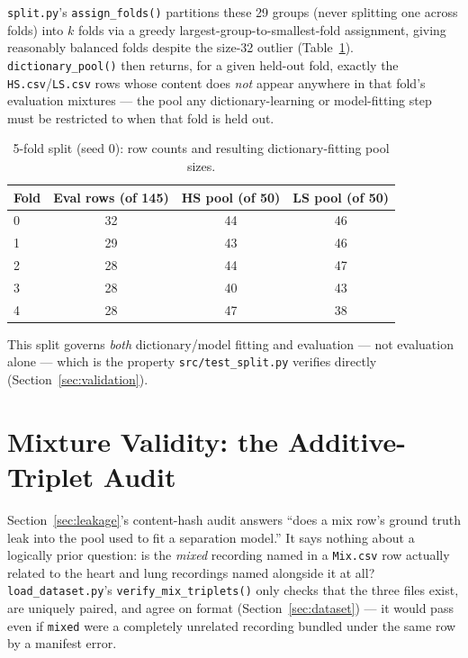 \documentclass[11pt]{article}
\begin{document}
\texttt{split.py}'s \texttt{assign\_folds()} partitions these 29 groups
(never splitting one across folds) into $k$ folds via a greedy
largest-group-to-smallest-fold assignment, giving reasonably balanced folds
despite the size-32 outlier (Table~\ref{tab:foldsizes}).
\texttt{dictionary\_pool()} then returns, for a given held-out fold, exactly
the \texttt{HS.csv}/\texttt{LS.csv} rows whose content does \emph{not}
appear anywhere in that fold's evaluation mixtures --- the pool any
dictionary-learning or model-fitting step must be restricted to when that
fold is held out.

\begin{table}[H]
\centering
\caption{5-fold split (seed 0): row counts and resulting dictionary-fitting pool sizes.}
\label{tab:foldsizes}
\begin{tabular}{@{}lccc@{}}
\toprule
Fold & Eval rows (of 145) & HS pool (of 50) & LS pool (of 50) \\
\midrule
0 & 32 & 44 & 46 \\
1 & 29 & 43 & 46 \\
2 & 28 & 44 & 47 \\
3 & 28 & 40 & 43 \\
4 & 28 & 47 & 38 \\
\bottomrule
\end{tabular}
\end{table}

This split governs \emph{both} dictionary/model fitting and evaluation ---
not evaluation alone --- which is the property \texttt{src/test\_split.py}
verifies directly (Section~\ref{sec:validation}).

\section{Mixture Validity: the Additive-Triplet Audit}
\label{sec:validity}

Section~\ref{sec:leakage}'s content-hash audit answers ``does a mix row's
ground truth leak into the pool used to fit a separation model.'' It says
nothing about a logically prior question: is the \emph{mixed} recording
named in a \texttt{Mix.csv} row actually related to the heart and lung
recordings named alongside it at all? \texttt{load\_dataset.py}'s
\texttt{verify\_mix\_triplets()} only checks that the three files exist, are
uniquely paired, and agree on format (Section~\ref{sec:dataset}) --- it
would pass even if \texttt{mixed} were a completely unrelated recording
bundled under the same row by a manifest error.
\end{document}
